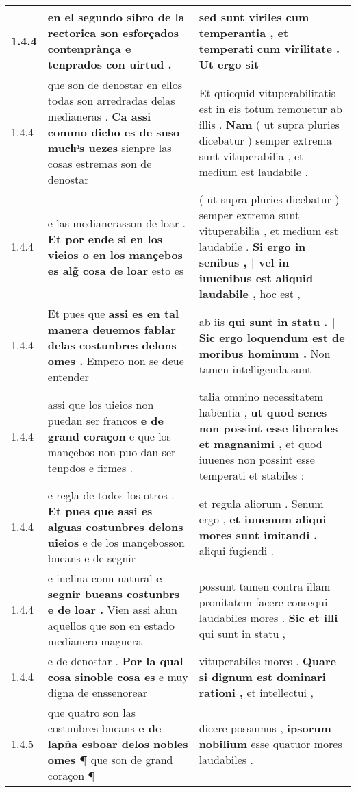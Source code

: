 \begin{tabular}{|p{1cm}|p{6.5cm}|p{6.5cm}|}
1.4.4 & en el segundo sibro de la rectorica \textbf{ son esforçados contenprànça } e tenprados con uirtud . & sed sunt viriles cum temperantia , \textbf{ et temperati cum virilitate . } Ut ergo sit \\\hline
1.4.4 & que son de denostar en ellos todas son arredradas delas medianeras . \textbf{ Ca assi commo dicho es de suso muchͣs uezes } sienpre las cosas estremas son de denostar & Et quicquid vituperabilitatis est in eis totum remouetur ab illis . \textbf{ Nam } ( ut supra pluries dicebatur ) semper extrema sunt vituperabilia , et medium est laudabile . \\\hline
1.4.4 & e las medianerasson de loar . \textbf{ Et por ende si en los vieios o en los mançebos es alg̃ cosa de loar } esto es & ( ut supra pluries dicebatur ) semper extrema sunt vituperabilia , et medium est laudabile . \textbf{ Si ergo in senibus , | vel in iuuenibus est aliquid laudabile , } hoc est , \\\hline
1.4.4 & Et pues que \textbf{ assi es en tal manera deuemos fablar delas costunbres delons omes . } Empero non se deue entender & ab iis \textbf{ qui sunt in statu . | Sic ergo loquendum est de moribus hominum . } Non tamen intelligenda sunt \\\hline
1.4.4 & assi que los uieios non puedan ser francos \textbf{ e de grand coraçon } e que los mançebos non puo dan ser tenpdos e firmes . & talia omnino necessitatem habentia , \textbf{ ut quod senes non possint esse liberales et magnanimi , } et quod iuuenes non possint esse temperati et stabiles : \\\hline
1.4.4 & e regla de todos los otros . \textbf{ Et pues que assi es alguas costunbres delons uieios } e de los mançebosson bueans e de segnir & et regula aliorum . Senum ergo , \textbf{ et iuuenum aliqui mores sunt imitandi , } aliqui fugiendi . \\\hline
1.4.4 & e inclina conn natural \textbf{ e segnir bueans costunbrs e de loar . } Vien assi ahun aquellos que son en estado medianero maguera & possunt tamen contra illam pronitatem facere consequi laudabiles mores . \textbf{ Sic et illi } qui sunt in statu , \\\hline
1.4.4 & e de denostar . \textbf{ Por la qual cosa sinoble cosa es } e muy digna de enssenorear & vituperabiles mores . \textbf{ Quare si dignum est dominari rationi , } et intellectui , \\\hline
1.4.5 & que quatro son las costunbres bueans \textbf{ e de lapña esboar delos nobles omes ¶ } que son de grand coraçon ¶ & dicere possumus , \textbf{ ipsorum nobilium } esse quatuor mores laudabiles . \\\hline

\end{tabular}

